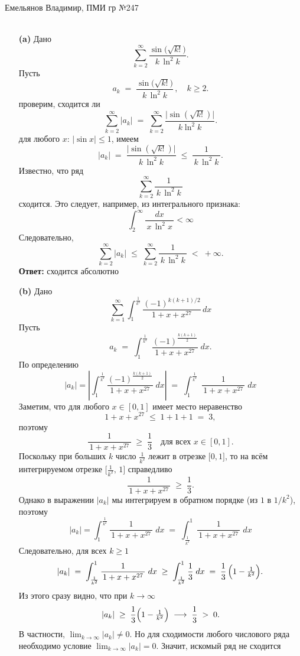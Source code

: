 \documentclass[a4paper]{article}
\renewcommand{\f}[2]{\frac{#1}{#2}}
\begin{document}
\section*{
\scalebox{0.9}{Домашнее задание на 08.06 (Математический анализ)}
}
{\large Емельянов Владимир, ПМИ гр №247}\\\\
\begin{enumerate}
\item[\textbf{(a)}]Дано
$$
\sum_{k=2}^{\infty} \frac{\sin\bigl(\sqrt{k!}\bigr)}{\,k\,\ln^2 k\,}.
$$
Пусть
$$
a_k \;=\;\frac{\sin\bigl(\sqrt{k!}\bigr)}{\,k\,\ln^2 k\,}\,,\quad k\ge2.
$$
проверим, сходится ли
$$
\sum_{k=2}^\infty |a_k| \;=\;\sum_{k=2}^\infty \frac{\bigl|\sin(\sqrt{k!})\bigr|}{\,k\ln^2 k\,}.
$$
для любого $x$: $\bigl|\sin x\bigr|\le 1$, имеем
$$
|a_k| \;=\;\frac{\bigl|\sin(\sqrt{k!})\bigr|}{\,k\,\ln^2 k\,}\;\le\;\frac{1}{\,k\,\ln^2 k\,}.
$$
Известно, что ряд
$$
\sum_{k=2}^\infty \frac{1}{\,k\,\ln^2 k\,}
$$
сходится. Это следует, например, из интегрального признака:
$$\displaystyle\int_2^\infty\frac{dx}{\,x\,\ln^2 x\,}<\infty$$
Следовательно,
$$
\sum_{k=2}^\infty |a_k|
\;\le\;
\sum_{k=2}^\infty \frac{1}{\,k\,\ln^2 k\,}
\;<\;+\infty.
$$ 
\textbf{Ответ: } сходится абсолютно\\

\item[\textbf{(b)}]Дано
$$\sum_{k=1}^{\infty} \int_1^\f{1}{k^2} \frac{(-1)^{k(k+1)/2}}{1 + x + x^{27}} \, dx$$
Пусть
$$
a_k \;=\;\int_{1}^{\frac{1}{k^2}}\;\frac{(-1)^{\frac{k(k+1)}{2}}}{\,1 + x + x^{27}\,}\;dx.
$$
По определению
$$
|a_k|
=
\left|\int_{1}^{\frac{1}{k^2}} \frac{(-1)^{\frac{k(k+1)}{2}}}{1 + x + x^{27}}\;dx \right|
\;=\;
\int_{1}^{\frac{1}{k^2}}\; \frac{1}{\,1 + x + x^{27}\,}\;dx
$$
Заметим, что для любого $x\in[0,1]$ имеет место неравенство
$$
1 + x + x^{27} \;\le\; 1 + 1 + 1 \;=\; 3,
$$
поэтому
$$
\frac{1}{\,1 + x + x^{27}\,}\;\ge\;\frac{1}{3}
\quad\text{для всех }x\in[0,1].
$$
Поскольку при больших $k$ число $\tfrac{1}{k^2}$ лежит в отрезке $\bigl[0,1\bigr]$, то на всём интегрируемом отрезке $\bigl[\tfrac{1}{k^2},\,1\bigr]$ справедливо
$$
\frac{1}{\,1 + x + x^{27}\,}\;\ge\;\frac{1}{3}.
$$
Однако в выражении $|a_k|$ мы интегрируем в обратном порядке (из $1$ в $1/k^2$), поэтому
$$
|a_k|
=
\int_{1}^{\frac{1}{k^2}} \frac{1}{\,1 + x + x^{27}\,}\;dx
\;=\;
\int_{\frac{1}{k^2}}^{1} \frac{1}{\,1 + x + x^{27}\,}\;dx
$$
Следовательно, для всех $k\ge1$
$$
|a_k|
\;=\;
\int_{\frac{1}{k^2}}^{1} \frac{1}{\,1 + x + x^{27}\,}\;dx
\;\ge\;
\int_{\frac{1}{k^2}}^{1} \frac{1}{3}\;dx
\;=\;
\frac{1}{3}\,\Bigl(1 - \tfrac{1}{k^2}\Bigr).
$$
Из этого сразу видно, что при $k \to \infty$
$$
|a_k| \;\ge\; \frac{1}{3}\Bigl(1 - \tfrac{1}{k^2}\Bigr)\;\longrightarrow\;\frac{1}{3} \;>\;0.
$$
В частности, $\displaystyle\lim_{k\to\infty} |a_k|\neq 0$. 
Но для сходимости любого числового ряда необходимо условие $\lim_{k\to\infty} 
|a_k| = 0$. Значит, искомый ряд не сходится


\end{enumerate}
\end{document}
